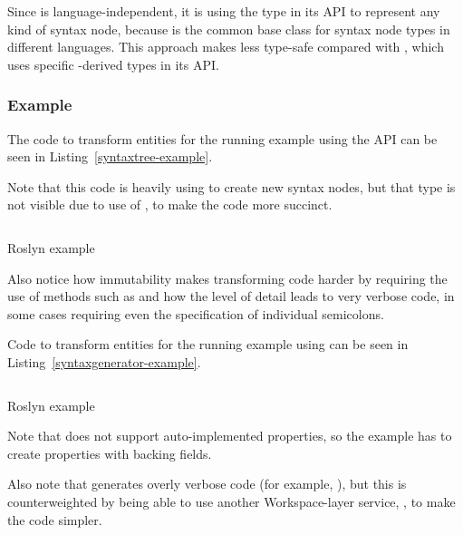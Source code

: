 \begin{itemize}
Since  is language-independent, it is using the  type  in its \ac{API} to represent any kind of syntax node, because  is the common base class for syntax node types in different languages. This approach makes  less type-safe compared with , which uses specific -derived types in its \ac{API}.
\end{itemize}

\subsubsection{Example}

The code to transform entities for the running example using the  \ac{API} can be seen in Listing~\ref{syntaxtree-example}.

Note that this code is heavily using  to create new syntax nodes, but that type is not visible due to use of , to make the code more succinct.

\begin{listing}
\inputminted[firstline=15,lastline=50]{csharp}{samples/Roslyn/Program.cs}
\caption{Roslyn  example}
\label{syntaxtree-example}
\end{listing}

Also notice how immutability makes transforming code harder by requiring the use of methods such as  and how the level of detail leads to very verbose code, in some cases requiring even the specification of individual semicolons.

\medskip

Code to transform entities for the running example using  can be seen in Listing~\ref{syntaxgenerator-example}.

\begin{listing}
\inputminted[firstline=17,lastline=73]{csharp}{samples/Roslyn.SyntaxGenerator/Program.cs}
\caption{Roslyn  example}
\label{syntaxgenerator-example}
\end{listing}

Note that  does not support auto-implemented properties, so the example has to create properties with backing fields.

Also note that  generates overly verbose code (for example, ), but this is counterweighted by being able to use another Workspace-layer service, , to make the code simpler.


